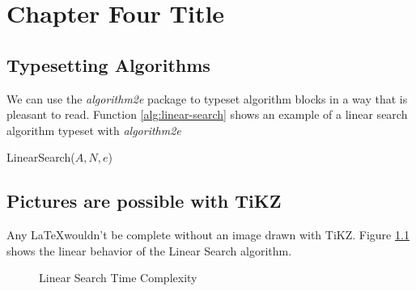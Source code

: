 \documentclass[../main]{subfiles}
\begin{document}
\chapter{Chapter Four Title}

\section{Typesetting Algorithms}

We can use the \emph{algorithm2e} package to typeset algorithm blocks in a way
that is pleasant to read. Function \ref{alg:linear-search} shows an example of a
linear search algorithm typeset with \emph{algorithm2e}

\begin{function}[H]
  \caption{LinearSearch($A,N,e$)}
  \label{alg:linear-search}
\end{function}

\section{Pictures are possible with TiKZ}

Any \LaTeX wouldn't be complete without an image drawn with TiKZ. Figure
\ref{fig:linear-search} shows the linear behavior of the Linear Search
algorithm.

\begin{figure}[h]
  \centering
  \caption{Linear Search Time Complexity}
  \label{fig:linear-search}
\end{figure}
\end{document}
